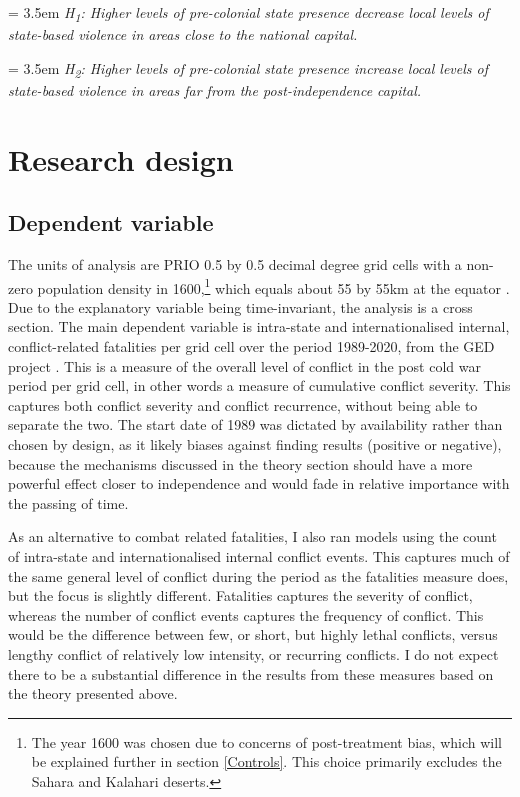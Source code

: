 \documentclass[12pt]{article}
\begin{document}
\bigskip
\hangindent = 3.5em \textit{H\textsubscript{1}: Higher levels of pre-colonial
	state presence decrease local levels of state-based violence in areas
	close to the national capital.}

\bigskip
\hangindent = 3.5em \textit{H\textsubscript{2}: Higher levels of pre-colonial
	state presence increase local levels of state-based violence in areas
	far from the post-independence capital.}

\section{Research design} \label{Research design}

\subsection{Dependent variable} \label{Dependent variable}

The units of analysis are PRIO 0.5 by 0.5 decimal degree grid cells with a
non-zero population density in 1600,\footnote{The year 1600 was chosen due to
	concerns of post-treatment bias, which will be explained further in
	section \ref{Controls}. This choice primarily excludes the Sahara and
Kalahari deserts.} which equals about 55 by 55km at the equator
\citep{Tollefsen2012}. Due to the explanatory variable being time-invariant, the
analysis is a cross section. The main dependent variable is intra-state and
internationalised internal, conflict-related fatalities per grid cell over the
period 1989-2020, from the GED project \citep{Sundberg2013}. This is a measure
of the overall level of conflict in the post cold war period per grid cell, in
other words a measure of cumulative conflict severity. This captures both
conflict severity and conflict recurrence, without being able to separate the
two. The start date of 1989 was dictated by availability rather than chosen by
design, as it likely biases against finding results (positive or negative),
because the mechanisms discussed in the theory section should have a more
powerful effect closer to independence and would fade in relative importance
with the passing of time.

As an alternative to combat related fatalities, I also ran models using the
count of intra-state and internationalised internal conflict events. This
captures much of the same general level of conflict during the period as the
fatalities measure does, but the focus is slightly different. Fatalities
captures the severity of conflict, whereas the number of conflict events
captures the frequency of conflict. This would be the difference between few, or
short, but highly lethal conflicts, versus lengthy conflict of relatively low
intensity, or recurring conflicts. I do not expect there to be a substantial
difference in the results from these measures based on the theory presented
above.
\end{document}

